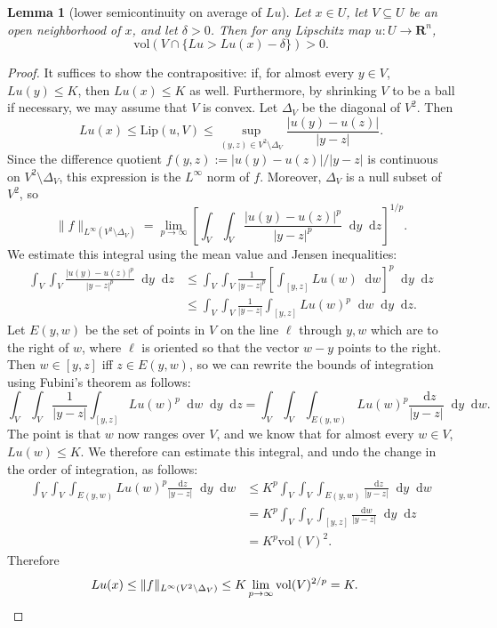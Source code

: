 \documentclass[reqno,11pt]{amsart}
\newcommand{\RR}{\mathbf{R}}
\newcommand*\dif{\mathop{}\!\mathrm{d}}
\newcommand{\vol}{\mathrm{vol}}
\newcommand{\Lip}{\mathrm{Lip}}
\newtheorem{lemma}[theorem]{Lemma}
\theoremstyle{definition}
\numberwithin{equation}{section}
\begin{document}
\begin{lemma}[lower semicontinuity on average of $Lu$]\label{partial lower semicontinuity}
Let $x \in U$, let $V \subseteq U$ be an open neighborhood of $x$, and let $\delta > 0$.
Then for any Lipschitz map $u: U \to \RR^n$,
$$\vol(V \cap \{Lu > Lu(x) - \delta\}) > 0.$$
\end{lemma}
\begin{proof}
It suffices to show the contrapositive: if, for almost every $y \in V$, $Lu(y) \leq K$, then $Lu(x) \leq K$ as well.
Furthermore, by shrinking $V$ to be a ball if necessary, we may assume that $V$ is convex.
Let $\Delta_V$ be the diagonal of $V^2$. Then
$$Lu(x) \leq \Lip(u, V) \leq \sup_{(y, z) \in V^2 \setminus \Delta_V} \frac{|u(y) - u(z)|}{|y - z|}.$$
Since the difference quotient $f(y, z) := |u(y) - u(z)|/|y - z|$ is continuous on $V^2 \setminus \Delta_V$, this expression is the $L^\infty$ norm of $f$.
Moreover, $\Delta_V$ is a null subset of $V^2$, so
$$\|f\|_{L^\infty(V^2 \setminus \Delta_V)} = \lim_{p \to \infty} \left[\int_V \int_V \frac{|u(y) - u(z)|^p}{|y - z|^p} \dif y \dif z\right]^{1/p}.$$
We estimate this integral using the mean value and Jensen inequalities:
\begin{align*} 
\int_V \int_V \frac{|u(y) - u(z)|^p}{|y - z|^p} \dif y \dif z 
&\leq \int_V \int_V \frac{1}{|y - z|^p} \left[\int_{[y, z]} Lu(w) \dif w\right]^p \dif y \dif z \\
&\leq \int_V \int_V \frac{1}{|y - z|} \int_{[y, z]} Lu(w)^p \dif w \dif y \dif z. 
\end{align*}
Let $E(y, w)$ be the set of points in $V$ on the line $\ell$ through $y, w$ which are to the right of $w$, where $\ell$ is oriented so that the vector $w - y$ points to the right.
Then $w \in [y, z]$ iff $z \in E(y, w)$, so we can rewrite the bounds of integration using Fubini's theorem as follows:
$$\int_V \int_V \frac{1}{|y - z|} \int_{[y, z]} Lu(w)^p \dif w \dif y \dif z = \int_V \int_V \int_{E(y, w)} Lu(w)^p \frac{\dif z}{|y - z|} \dif y \dif w.$$
The point is that $w$ now ranges over $V$, and we know that for almost every $w \in V$, $Lu(w) \leq K$.
We therefore can estimate this integral, and undo the change in the order of integration, as follows:
\begin{align*} 
\int_V \int_V \int_{E(y, w)} Lu(w)^p \frac{\dif z}{|y - z|} \dif y \dif w
&\leq K^p \int_V \int_V \int_{E(y, w)} \frac{\dif z}{|y - z|} \dif y \dif w \\
&= K^p \int_V \int_V \int_{[y, z]} \frac{\dif w}{|y - z|} \dif y \dif z \\
&= K^p \vol(V)^2.
\end{align*}
Therefore 
\begin{align*}
Lu(x) &\leq \|f\|_{L^\infty(V^2 \setminus \Delta_V)} \leq K \lim_{p \to \infty} \vol(V)^{2/p} = K. \qedhere 
\end{align*}  
\end{proof}
\end{document}
